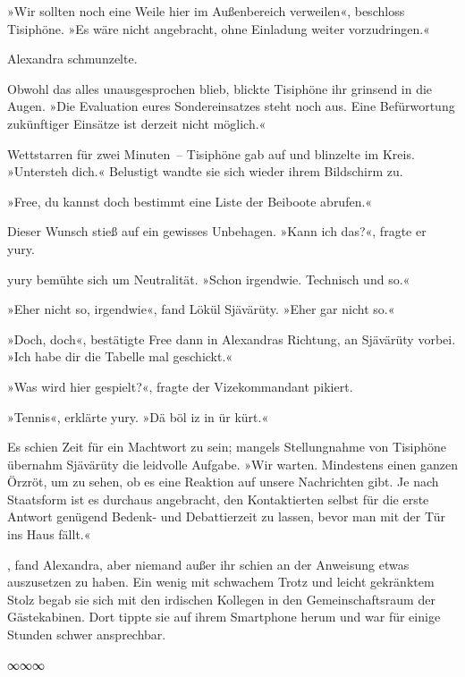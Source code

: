 »Wir sollten noch eine Weile hier im Außenbereich verweilen«, beschloss Tisiphöne. »Es wäre nicht angebracht, ohne Einladung weiter vorzudringen.«

Alexandra schmunzelte. 

Obwohl das alles unausgesprochen blieb, blickte Tisiphöne ihr grinsend in die Augen. »Die Evaluation eures Sondereinsatzes steht noch aus. Eine Befürwortung zukünftiger Einsätze ist derzeit nicht möglich.«

Wettstarren für zwei Minuten~– Tisiphöne gab auf und blinzelte im Kreis. »Untersteh dich.« Belustigt wandte sie sich wieder ihrem Bildschirm zu.

»Free, du kannst doch bestimmt eine Liste der Beiboote abrufen.«

Dieser Wunsch stieß auf ein gewisses Unbehagen. »Kann ich das?«, fragte er yury.

yury bemühte sich um Neutralität. »Schon irgendwie. Technisch und so.«

»Eher nicht so, irgendwie«, fand Lökül Sjävärüty. »Eher gar nicht so.«

»Doch, doch«, bestätigte Free dann in Alexandras Richtung, an Sjävärüty vorbei. »Ich habe dir die Tabelle mal geschickt.«

»Was wird hier gespielt?«, fragte der Vizekommandant pikiert.

»Tennis«, erklärte yury. »Dä böl iz in ür kürt.«

Es schien Zeit für ein Machtwort zu sein; mangels Stellungnahme von Tisiphöne übernahm Sjävärüty die leidvolle Aufgabe. »Wir warten. Mindestens einen ganzen Örzröt, um zu sehen, ob es eine Reaktion auf unsere Nachrichten gibt. Je nach Staatsform ist es durchaus angebracht, den Kontaktierten selbst für die erste Antwort genügend Bedenk- und Debattierzeit zu lassen, bevor man mit der Tür ins Haus fällt.«

, fand Alexandra, aber niemand außer ihr schien an der Anweisung etwas auszusetzen zu haben. Ein wenig mit schwachem Trotz und leicht gekränktem Stolz begab sie sich mit den irdischen Kollegen in den Gemeinschaftsraum der Gästekabinen. Dort tippte sie auf ihrem Smartphone herum und war für einige Stunden schwer ansprechbar.

\begin{center}
∞∞∞
\end{center}

